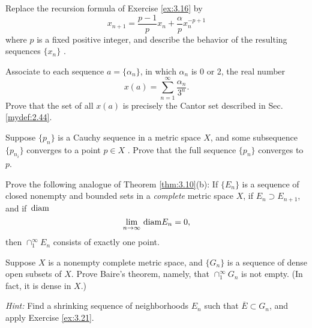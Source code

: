 \begin{myexercise}
    \label{ex:3.18}
    Replace the recursion formula of Exercise \ref{ex:3.16} by 
    \begin{equation*}
        x_{n+1} = \frac{p-1}{p}x_n + \frac{\alpha}{p}x_n^{-p+1}
    \end{equation*}
    where $p$ is a fixed positive integer, and describe the behavior of the resulting sequences $\{x_n\}$ .
\end{myexercise}

\begin{myexercise}
    \label{ex:3.19}
    Associate to each sequence $a = \{\alpha_n\}$, 
    in which $\alpha_n$ is 0 or 2,
    the real number 
    \begin{equation*}
        x(a) = \sum_{n=1}^{\infty} \frac{\alpha_n}{3^n} .
    \end{equation*}
    Prove that the set of all $x(a)$ is precisely the Cantor set described in Sec. \ref{mydef:2.44}.
\end{myexercise}


\begin{myexercise}
    \label{ex:3.20}
    Suppose $\{p_n\}$ is a Cauchy sequence in a metric space $X$,
    and some subsequence $\{p_{n_i}\}$ converges to a point $p \in X$ .
    Prove that the full sequence $\{p_n\}$ converges to $p$.
\end{myexercise}


\begin{myexercise}
    \label{ex:3.21}
    Prove the following analogue of Theorem \ref{thm:3.10}(b): 
    If $\{E_n\}$ is a sequence of closed nonempty and bounded sets in a \emph{complete} metric space $X$, 
    if $E_n \supset E_{n+1}$, and if $\protect\mathop{}\mathrm{diam}$
    \begin{equation*}
        \lim_{n \to \infty} \protect\mathop{}\mathrm{diam} E_n = 0 ,
    \end{equation*}
    then $\cap_1^{\infty} E_n$ consists of exactly one point.
\end{myexercise}


\begin{myexercise}
    \label{ex:3.22}
    Suppose $X$ is a nonempty complete metric space, 
    and $\{G_n\}$ is a sequence of dense open subsets of $X$. 
    Prove Baire's theorem, namely, that $\cap_1^{\infty} G_n$ is not
    empty. 
    (In fact, it is dense in $X$.) 
    
    \emph{Hint:} Find a shrinking sequence of neighborhoods $E_n$ such that 
    $\overline{E} \subset G_n$, and apply Exercise \ref{ex:3.21}.
\end{myexercise}


